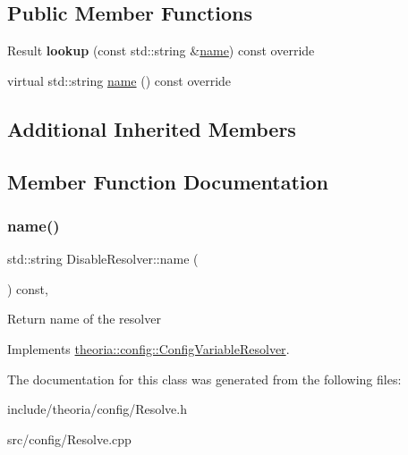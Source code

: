 \subsection*{Public Member Functions}
\begin{DoxyCompactItemize}
\item 
\mbox{\label{classtheoria_1_1config_1_1DisableResolver_ae366903d552dd3a34a380e4918525cd1}} 
Result {\bfseries lookup} (const std\+::string \&\hyperlink{classtheoria_1_1config_1_1DisableResolver_ae7caa7a59ad2921ec2cba0544ed26ad0}{name}) const override
\item 
virtual std\+::string \hyperlink{classtheoria_1_1config_1_1DisableResolver_ae7caa7a59ad2921ec2cba0544ed26ad0}{name} () const override
\end{DoxyCompactItemize}
\subsection*{Additional Inherited Members}


\subsection{Member Function Documentation}
\mbox{\label{classtheoria_1_1config_1_1DisableResolver_ae7caa7a59ad2921ec2cba0544ed26ad0}} 
\subsubsection{\texorpdfstring{name()}{name()}}
{\footnotesize\ttfamily std\+::string Disable\+Resolver\+::name (\begin{DoxyParamCaption}{ }\end{DoxyParamCaption}) const\hspace{0.3cm}{\ttfamily [override]}, {\ttfamily [virtual]}}

Return name of the resolver 

Implements \hyperlink{classtheoria_1_1config_1_1ConfigVariableResolver_a026bda729faf988eaef334a45ec92303}{theoria\+::config\+::\+Config\+Variable\+Resolver}.



The documentation for this class was generated from the following files\+:\begin{DoxyCompactItemize}
\item 
include/theoria/config/Resolve.\+h\item 
src/config/Resolve.\+cpp\end{DoxyCompactItemize}

